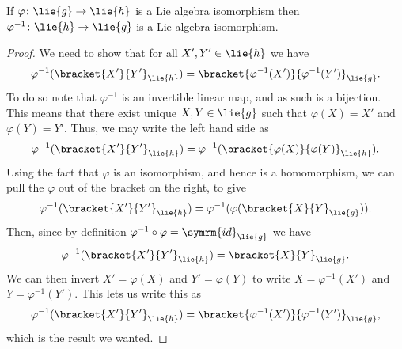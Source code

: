 \documentclass[fleqn]{NotesClass}
\newcommand{\id}{\symrm{id}}
\begin{document}
    \begin{lma}{}{}
        If \(\varphi \colon \lie{g} \to \lie{h}\) is a Lie algebra isomorphism then \(\varphi^{-1} \colon \lie{h} \to \lie{g}\) is a Lie algebra isomorphism.
        \begin{proof}
            We need to show that for all \(X', Y' \in \lie{h}\) we have
            \begin{equation}
                \varphi^{-1}(\bracket{X'}{Y'}_{\lie{h}}) = \bracket{\varphi^{-1}(X')}{\varphi^{-1}(Y')}_{\lie{g}}.
            \end{equation}
            To do so note that \(\varphi^{-1}\) is an invertible linear map, and as such is a bijection.
            This means that there exist unique \(X, Y \in \lie{g}\) such that \(\varphi(X) = X'\) and \(\varphi(Y) = Y'\).
            Thus, we may write the left hand side as
            \begin{equation}
                \varphi^{-1}(\bracket{X'}{Y'}_{\lie{h}}) = \varphi^{-1}(\bracket{\varphi(X)}{\varphi(Y)}_{\lie{h}}).
            \end{equation}
            Using the fact that \(\varphi\) is an isomorphism, and hence is a homomorphism, we can pull the \(\varphi\) out of the bracket on the right, to give
            \begin{equation}
                \varphi^{-1}(\bracket{X'}{Y'}_{\lie{h}}) = \varphi^{-1}(\varphi(\bracket{X}{Y}_{\lie{g}})).
            \end{equation}
            Then, since by definition \(\varphi^{-1} \circ \varphi = \id_{\lie{g}}\) we have
            \begin{equation}
                \varphi^{-1}(\bracket{X'}{Y'}_{\lie{h}}) = \bracket{X}{Y}_{\lie{g}}.
            \end{equation}
            We can then invert \(X' = \varphi(X)\) and \(Y' = \varphi(Y)\) to write \(X = \varphi^{-1}(X')\) and \(Y = \varphi^{-1}(Y')\).
            This lets us write this as
            \begin{equation}
                \varphi^{-1}(\bracket{X'}{Y'}_{\lie{h}}) = \bracket{\varphi^{-1}(X')}{\varphi^{-1}(Y')}_{\lie{g}},
            \end{equation}
            which is the result we wanted.
        \end{proof}
    \end{lma}
    
\end{document}
